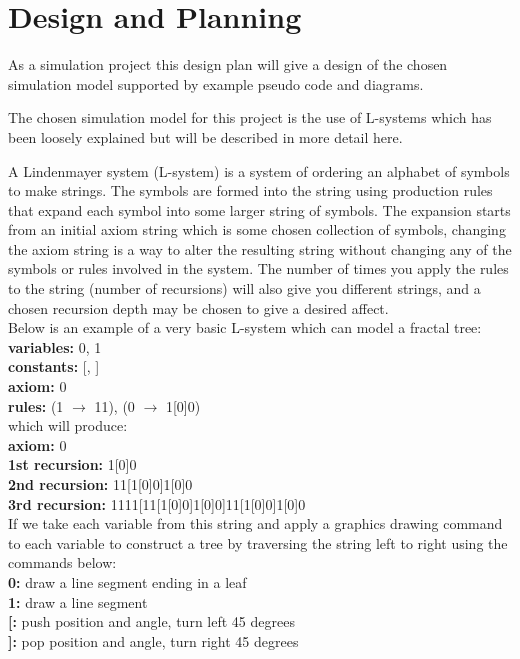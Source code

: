 \documentclass[progress]{cmpreport}
\begin{document}
\section{Design and Planning}
As a simulation project this design plan will give a design of the chosen simulation model 
supported by example pseudo code and diagrams.


The chosen simulation model for this project is the use of L-systems which has been loosely 
explained but will be described in more detail here.

A Lindenmayer system (L-system) is a system of ordering an alphabet of symbols to make 
strings. The symbols are formed into the string using production rules that expand each 
symbol into some larger string of symbols. The expansion starts from an initial axiom string 
which is some chosen collection of symbols, changing the axiom string is a way to alter the 
resulting string without changing any of the symbols or rules involved in the system. The 
number of times you apply the rules to the string (number of recursions) will also give you 
different strings, and a chosen recursion depth may be chosen to give a desired affect.\\

Below is an example of a very basic L-system which can model a fractal tree:\\

\noindent \textbf{variables:} 0, 1 \\
\textbf{constants:} [, ] \\
\textbf{axiom:} 0 \\
\textbf{rules:} (1 $\rightarrow$ 11), (0 $\rightarrow$ 1[0]0) \\

which will produce: \\

\noindent \textbf{axiom:} 0 \\
\textbf{1st recursion:} 1[0]0 \\
\textbf{2nd recursion:} 11[1[0]0]1[0]0 \\
\textbf{3rd recursion:} 1111[11[1[0]0]1[0]0]11[1[0]0]1[0]0 \\

\pagebreak
If we take each variable from this string and apply a graphics drawing command to each 
variable to construct a tree by traversing the string left to right using the commands below: \\

\noindent \textbf{0:} draw a line segment ending in a leaf \\
\textbf{1:} draw a line segment \\
\textbf{[:} push position and angle, turn left 45 degrees \\
\textbf{]:} pop position and angle, turn right 45 degrees \\
\end{document}
